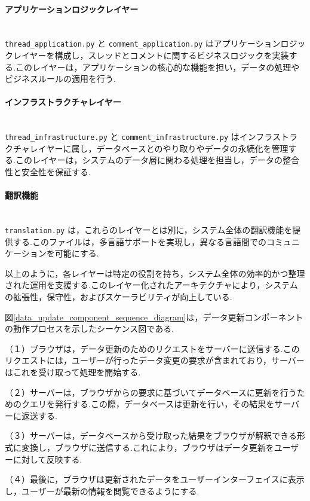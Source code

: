 \documentclass[b5paper,12pt,dvipdfmx]{jsreport}
\begin{document}
\paragraph{アプリケーションロジックレイヤー}\mbox{}\\
\texttt{thread\_application.py} と \texttt{comment\_application.py} はアプリケーションロジックレイヤーを構成し，スレッドとコメントに関するビジネスロジックを実装する.このレイヤーは，アプリケーションの核心的な機能を担い，データの処理やビジネスルールの適用を行う.

\paragraph{インフラストラクチャレイヤー}\mbox{}\\
\texttt{thread\_infrastructure.py} と \texttt{comment\_infrastructure.py} はインフラストラクチャレイヤーに属し，データベースとのやり取りやデータの永続化を管理する.このレイヤーは，システムのデータ層に関わる処理を担当し，データの整合性と安全性を保証する.

\paragraph{翻訳機能}\mbox{}\\
\texttt{translation.py} は，これらのレイヤーとは別に，システム全体の翻訳機能を提供する.このファイルは，多言語サポートを実現し，異なる言語間でのコミュニケーションを可能にする.

以上のように，各レイヤーは特定の役割を持ち，システム全体の効率的かつ整理された運用を支援する.このレイヤー化されたアーキテクチャにより，システムの拡張性，保守性，およびスケーラビリティが向上している.


図\ref{data_update_component_sequence_diagram}は，データ更新コンポーネントの動作プロセスを示したシーケンス図である.

（１）ブラウザは，データ更新のためのリクエストをサーバーに送信する.このリクエストには，ユーザーが行ったデータ変更の要求が含まれており，サーバーはこれを受け取って処理を開始する.

（２）サーバーは，ブラウザからの要求に基づいてデータベースに更新を行うためのクエリを発行する.この際，データベースは更新を行い，その結果をサーバーに返送する.

（３）サーバーは，データベースから受け取った結果をブラウザが解釈できる形式に変換し，ブラウザに送信する.これにより，ブラウザはデータ更新をユーザーに対して反映する.

（４）最後に，ブラウザは更新されたデータをユーザーインターフェイスに表示し，ユーザーが最新の情報を閲覧できるようにする.
\end{document}
